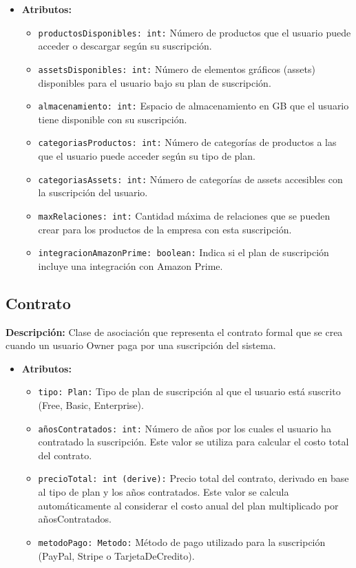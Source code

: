 \documentclass[12pt.a4paper]{article}
\begin{document}
    \begin{itemize}
        \item {\textbf{Atributos:}}
        \begin{itemize}
            \item \texttt{productosDisponibles: int:} Número de productos que el usuario puede acceder o descargar según su suscripción.
            \item \texttt{assetsDisponibles: int:} Número de elementos gráficos (assets) disponibles para el usuario bajo su plan de suscripción.
            \item \texttt{almacenamiento: int:} Espacio de almacenamiento en GB que el usuario tiene disponible con su suscripción.
            \item \texttt{categoriasProductos: int:} Número de categorías de productos a las que el usuario puede acceder según su tipo de plan.
            \item \texttt{categoriasAssets: int:} Número de categorías de assets accesibles con la suscripción del usuario.
            \item \texttt{maxRelaciones: int:} Cantidad máxima de relaciones que se pueden crear para los productos de la empresa con esta suscripción.
            \item \texttt{integracionAmazonPrime: boolean:} Indica si el plan de suscripción incluye una integración con Amazon Prime.
        \end{itemize}
    \end{itemize}

\subsection{Contrato}
\textbf{Descripción:} Clase de asociación que representa el contrato formal que se crea cuando un usuario Owner paga por una suscripción del sistema.
    \begin{itemize}
        \item {\textbf{Atributos:}}
        \begin{itemize}
            \item \texttt{tipo: Plan:} Tipo de plan de suscripción al que el usuario está suscrito (Free, Basic, Enterprise).
             \item \texttt{añosContratados: int:} Número de años por los cuales el usuario ha contratado la suscripción. Este valor se utiliza para calcular el costo total del contrato.
             \item \texttt{precioTotal: int (derive):} Precio total del contrato, derivado en base al tipo de plan y los años contratados. Este valor se calcula automáticamente al considerar el costo anual del plan multiplicado por añosContratados.
             \item \texttt{metodoPago: Metodo:} Método de pago utilizado para la suscripción (PayPal, Stripe o TarjetaDeCredito).
        \end{itemize}
    \end{itemize}
\end{document}
